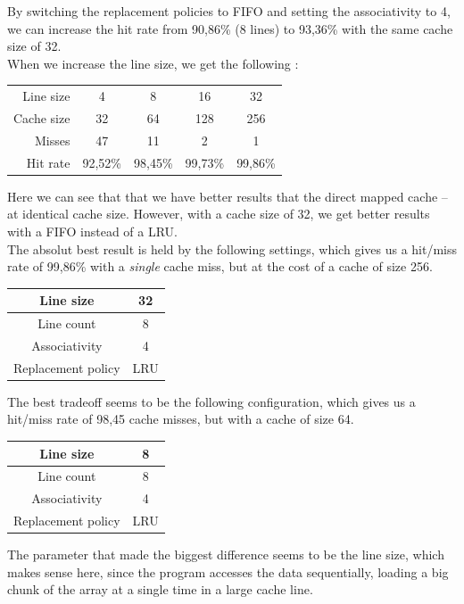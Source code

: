 \documentclass[a4paper]{report}
\begin{document}
By switching the replacement policies to FIFO and setting the associativity to 4, we can increase the hit
rate from 90,86\% (8 lines) to 93,36\% with the same cache size of 32.
\mbox{}\\

When we increase the line size, we get the following :

\begin{center}
	\begin{tabular}{|r||c|c|c|c|}
		\hline
		Line size  & 4       & 8       & 16      & 32      \\
		Cache size & 32      & 64      & 128     & 256     \\
		Misses     & 47      & 11      & 2       & 1       \\
		Hit rate   & 92,52\% & 98,45\% & 99,73\% & 99,86\% \\
		\hline
	\end{tabular}
\end{center}

Here we can see that that we have better results that the direct mapped cache -- at identical cache size.
However, with a cache size of 32, we get better results with a FIFO instead of a LRU.
\mbox{}\\

The absolut best result is held by the following settings, which gives us a hit/miss rate of 99,86\% with a
\emph{single} cache miss, but at the cost of a cache of size 256.

\begin{center}
	\begin{tabular}{|cc|}
		\hline
		Line size          & 32  \\
		\hline
		Line count         & 8   \\
		\hline
		Associativity      & 4   \\
		\hline
		Replacement policy & LRU \\
		\hline
	\end{tabular}
\end{center}

The best tradeoff seems to be the following configuration, which gives us a hit/miss rate of 98,45%
cache misses, but with a cache of size 64.

\begin{center}
	\begin{tabular}{|cc|}
		\hline
		Line size          & 8   \\
		\hline
		Line count         & 8   \\
		\hline
		Associativity      & 4   \\
		\hline
		Replacement policy & LRU \\
		\hline
	\end{tabular}
\end{center}

The parameter that made the biggest difference seems to be the line size, which makes sense here, since the
program accesses the data sequentially, loading a big chunk of the array at a single time in a large cache
line.
\end{document}
